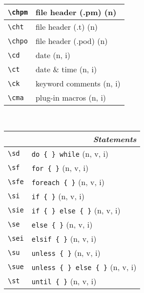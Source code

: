 \documentclass[oneside,10pt,landscape,DIV17]{scrartcl}
\begin{document}
\begin{multicols}{3}
\begin{center}
\begin{tabular}[]{|p{11mm}|p{60mm}|}
\hline     \verb'\chpm' & file header (.pm)                 \hfill (n)      \\
\hline     \verb'\cht'  & file header (.t)                  \hfill (n)      \\
\hline     \verb'\chpo' & file header (.pod)                \hfill (n)      \\
\hline     \verb'\cd'   & date                              \hfill (n, i)   \\
\hline     \verb'\ct'   & date \& time                      \hfill (n, i)   \\
\hline     \verb'\ck'   & keyword comments                  \hfill (n, i)   \\
\hline     \verb'\cma'  & plug-in macros                     \hfill (n, i)   \\
\hline
\end{tabular}\\
%
%
\begin{tabular}[]{|p{11mm}|p{60mm}|}
\hline
\multicolumn{2}{|r|}{\textsl{\textbf{S}tatements}}                    \\[1.0ex]
\hline \verb'\sd'      & \verb'do { } while'          \hfill (n, v, i)\\
\hline \verb'\sf'      & \verb'for { }'               \hfill (n, v, i)\\
\hline \verb'\sfe'     & \verb'foreach { }'           \hfill (n, v, i)\\
\hline \verb'\si'      & \verb'if { }'                \hfill (n, v, i)\\
\hline \verb'\sie'     & \verb'if { } else { }'       \hfill (n, v, i)\\
\hline \verb'\se'      & \verb'else { }'              \hfill (n, v, i)\\
\hline \verb'\sei'     & \verb'elsif { }'             \hfill (n, v, i)\\
\hline \verb'\su'      & \verb'unless { }'            \hfill (n, v, i)\\
\hline \verb'\sue'     & \verb'unless { } else { }'   \hfill (n, v, i)\\
\hline \verb'\st'      & \verb'until { }'             \hfill (n, v, i)\\

\end{tabular}
\end{center}
\end{multicols}
\end{document}
